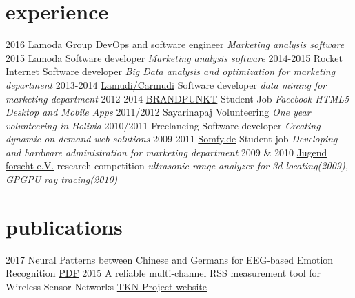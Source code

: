 \documentclass[]{friggeri-cv}
\begin{document}
\section{experience}

\begin{entrylist}
  \entry
    {2016}
    {{Lamoda Group}}
    {DevOps and software engineer}
    {\emph{Marketing analysis software}}
  \entry
    {2015}
    {\href{http://www.lamoda.ru/}{Lamoda}}
    {Software developer}
    {\emph{Marketing analysis software}}
  \entry
    {2014-2015}
    {\href{http://www.rocket-internet.com/}{Rocket Internet}}
    {Software developer}
    {\emph{Big Data analysis and optimization for marketing department}}
  \entry
    {2013-2014}
    {\href{http://www.lamudi.com/}{Lamudi/Carmudi}}
    {Software developer}
    {\emph{data mining for marketing department}}
  \entry
    {2012-2014}
    {\href{http://brandpunkt.com}{BRANDPUNKT}}
    {Student Job}
    {\emph{Facebook HTML5 Desktop and Mobile Apps}}
  \entry
    {2011/2012}
    {Sayarinapaj}
    {Volunteering}
    {\emph{One year volunteering in Bolivia}}
  \entry
    {2010/2011}
    {Freelancing}
    {Software developer}
    {\emph{Creating dynamic on-demand web solutions}}
  \entry
    {2009-2011}
    {\href{http://www.somfy.de}{Somfy.de}}
    {Student job}
    {\emph{Developing and hardware administration for marketing department }}
  \entry
    {2009 \& 2010}
    {\href{http://jugend-forscht.de}{Jugend forscht e.V.}}
    {research competition}
    {\emph{ultrasonic range analyzer for 3d locating(2009), GPGPU ray tracing(2010)}}
\end{entrylist}

%

\section{publications}

\begin{entrylist}
  \entry
    {2017}
    {Neural Patterns between Chinese and Germans for EEG-based Emotion Recognition}
    {\href{http://bcmi.sjtu.edu.cn/~zhengweilong/pdf/NER17_WSY_finalsub.pdf}{PDF}}
    {}
  \entry
    {2015}
    {A reliable multi-channel RSS measurement tool for Wireless Sensor Networks}
    {\href{http://www.tkn.tu-berlin.de/index.php?id=159554}{TKN Project website}}
    {}
\end{entrylist}
\end{document}
